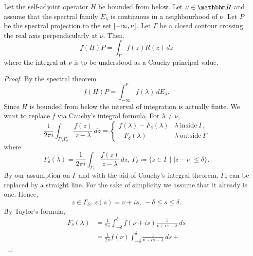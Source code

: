 \begin{lemma}\label{dunford01t}
Let the self-adjoint operator $H$ be bounded from below. Let $\nu\in\R$ and assume that 
the spectral family $E_\lambda$ is continuous in a neighbourhood of $\nu$. 
Let $P$ be the spectral projection to the set $\interval[open left]{-\infty}{\nu}$.
Let $\Gamma$ be a closed contour crossing the real axis perpendicularly at $\nu$. Then,
\begin{equation}\label{dunford01t01}
  f(H)P = \int_\Gamma f(z) R(z)\, dz
\end{equation}
where the integral at $\nu$ is to be understood as a Cauchy principal value.
\end{lemma}
\begin{proof}
By the spectral theorem
\begin{equation}\label{dunford01t02}
  f(H)P = \int_{-\infty}^\nu f(\lambda)\, dE_\lambda .
\end{equation}
Since $H$ is bounded from below the interval of integration is actually finite.
We want to replace $f$ via Cauchy's integral formula. For $\lambda\neq\nu$,
\begin{equation}\label{dunford01t03}
  \frac{1}{2\pi i} \int_{\Gamma\setminus\Gamma_\delta} \frac{f(z)}{z-\lambda} \, dz =
\begin{cases}
  f(\lambda) - F_\delta(\lambda) & \lambda \ \text{inside}\ \Gamma , \\
             - F_\delta(\lambda) & \lambda \ \text{outside}\ \Gamma
\end{cases}
\end{equation}
where
\begin{equation*}
   F_\delta(\lambda) =  \frac{1}{2\pi i} \int_{\Gamma_\delta} \frac{f(z)}{z-\lambda} \, dz,\
   \Gamma_\delta \coloneqq \{ z\in\Gamma \mid |z-\nu| \leq \delta \} .
\end{equation*}
By our assumption on $\Gamma$ and with the aid of Cauchy's integral theorem, $\Gamma_\delta$ can be replaced
by a straight line. For the sake of simplicity we assume that it already is one. Hence,
\begin{equation*}
  z\in\Gamma_\delta,\ z(s) = \nu + is,\ -\delta \leq s \leq\delta .
\end{equation*}
By Taylor's formula,
\begin{equation*}
\begin{split}
  F_\delta(\lambda)
    & = \frac{1}{2\pi}\int_{-\delta}^\delta f(\nu+is)\frac{1}{\nu+is-\lambda}\, ds \\
    & = \frac{1}{2\pi} f(\nu) \int_{-\delta}^\delta \frac{1}{\nu+is-\lambda}\, ds +

\end{split}
\end{equation*}
\end{proof}
